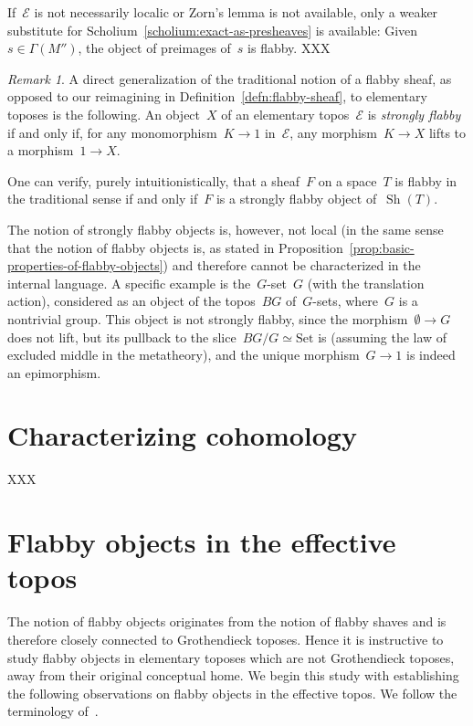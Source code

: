 \documentclass[oneside]{amsart}
\theoremstyle{definition}
\theoremstyle{plain}
\theoremstyle{remark}
\newtheorem{rem}[defn]{Remark}
\newcommand{\E}{\mathcal{E}}
\DeclareMathOperator{\Sh}{Sh}
\newcommand{\Set}{\mathrm{Set}}
\renewcommand{\_}{\mathpunct{.}\,}
\begin{document}
If~$\E$ is not necessarily localic or Zorn's lemma is not available, only a
weaker substitute for Scholium~\ref{scholium:exact-as-presheaves} is available:
Given~$s \in \Gamma(M'')$, the object of preimages of~$s$ is flabby. XXX

\begin{rem}A direct generalization of the traditional notion of a flabby sheaf, as
opposed to our reimagining in Definition~\ref{defn:flabby-sheaf}, to
elementary toposes is the following. An object~$X$ of an elementary topos~$\E$
is \emph{strongly flabby} if and only if, for any monomorphism~$K \to 1$
in~$\E$, any morphism~$K \to X$ lifts to a morphism~$1 \to X$.

One can verify, purely intuitionistically, that a sheaf~$F$ on a space~$T$ is
flabby in the traditional sense if and only if~$F$ is a strongly flabby object
of~$\Sh(T)$.

The notion of strongly flabby objects is, however, not local (in the same sense
that the notion of flabby objects is, as stated in
Proposition~\ref{prop:basic-properties-of-flabby-objects})
and therefore cannot be characterized in the internal language. A specific
example is the~$G$-set~$G$ (with the translation action), considered as an
object of the topos~$BG$ of~$G$-sets, where~$G$ is a nontrivial group.
This object is not strongly flabby, since the morphism~$\emptyset \to G$ does
not lift, but its pullback to the slice~$BG/G \simeq \Set$ is (assuming
the law of excluded middle in the metatheory), and the unique morphism~$G \to
1$ is indeed an epimorphism.
\end{rem}


\section{Characterizing cohomology}

XXX


\section{Flabby objects in the effective topos}

The notion of flabby objects originates from the notion of flabby shaves and is
therefore closely connected to Grothendieck toposes. Hence it is instructive
to study flabby objects in elementary toposes which are not Grothendieck
toposes, away from their original conceptual home. We begin this study with
establishing the following observations on flabby objects in the effective
topos. We follow the terminology of~\cite{hyland:effective-topos}.
\end{document}
